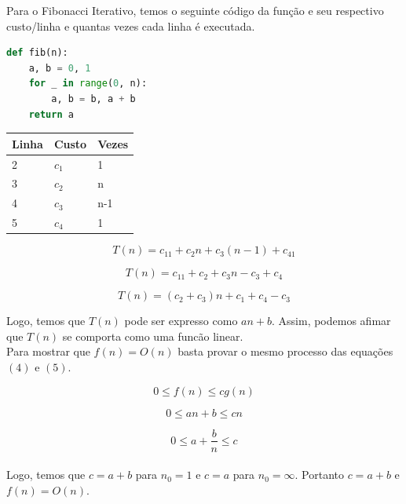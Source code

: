 \documentclass[a4paper, 12pt]{article}
\begin{document}
Para o Fibonacci Iterativo, temos o seguinte código da função e seu respectivo custo/linha e quantas vezes cada linha é executada.

\begin{lstlisting}[language=Python, caption= Código da função do Fibonacci Iterativo]
def fib(n):
    a, b = 0, 1
    for _ in range(0, n):
        a, b = b, a + b
    return a
\end{lstlisting}

\begin{center}
\begin{tabular}{|l|l|l|}
\hline
{\bf Linha} & {\bf Custo} & {\bf Vezes}\\
\hline
2 & $c_1$ & 1\\
\hline
3 & $c_2$ & n\\
\hline
4 & $c_3$ & n-1\\
\hline
5 & $c_4$ & 1\\
\hline
\end{tabular}
\end{center}

\begin{equation}
T(n) = c_11+c_2n+c_3(n-1)+c_41
\end{equation}

\begin{equation}
T(n) = c_11+c_2+c_3n-c_3+c_4
\end{equation}

\begin{equation}
T(n) = (c_2+c_3)n+c_1+c_4-c_3
\end{equation}

Logo, temos que $T(n)$ pode ser expresso como $an+b$. Assim, podemos afimar que $T(n)$ se comporta como uma funcão linear.\\

Para mostrar que $f(n)=O(n)$ basta provar o mesmo processo das equações $(4)$ e $(5)$.

\begin{equation}
0 \leq f(n) \leq cg(n)
\end{equation}

\begin{equation}
0 \leq an+b \leq cn
\end{equation}

\begin{equation}
0 \leq a+\frac{b}{n} \leq c
\end{equation}\\	

Logo, temos que $c=a+b$ para $n_0=1$ e $c=a$ para $n_0=\infty$. Portanto $c=a+b$ e $f(n) = O(n)$.
\end{document}
